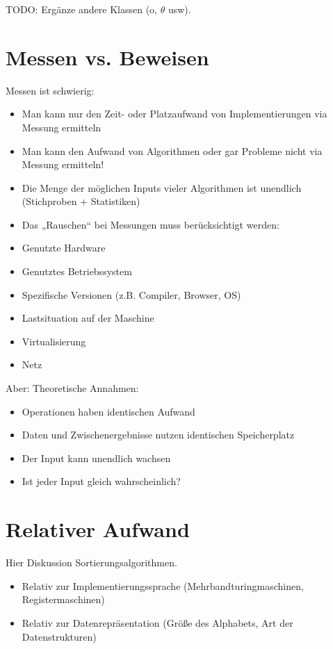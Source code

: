 TODO: Ergänze andere Klassen (o, $\theta$ usw).

\section{Messen vs. Beweisen}\label{messenVsBeweisen}

Messen ist schwierig:
\begin{itemize}
  \item Man kann nur den Zeit- oder Platzaufwand von Implementierungen via Messung ermitteln
  \item Man kann den Aufwand von Algorithmen oder gar Probleme nicht via Messung ermitteln!
  \item Die Menge der möglichen Inputs vieler Algorithmen ist unendlich (Stichproben + Statistiken)
  \item Das „Rauschen“ bei Messungen muss berücksichtigt werden:
  \item Genutzte Hardware
  \item Genutztes Betriebssystem
  \item Spezifische Versionen (z.B. Compiler, Browser, OS)
  \item Lastsituation auf der Maschine
  \item Virtualisierung
  \item Netz
\end{itemize}

Aber: Theoretische Annahmen:
\begin{itemize}
  \item Operationen haben identischen Aufwand
  \item Daten und Zwischenergebnisse nutzen identischen Speicherplatz
  \item Der Input kann unendlich wachsen
  \item Ist jeder Input gleich wahrscheinlich?
\end{itemize}

\section{Relativer Aufwand}
Hier Diskussion Sortierungsalgorithmen.
\begin{itemize}
    \item Relativ zur Implementierungssprache (Mehrbandturingmaschinen, Registermaschinen)
    \item Relativ zur Datenrepräsentation (Größe des Alphabets, Art der Datenstrukturen)
\end{itemize}
